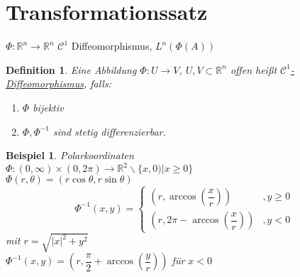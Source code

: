 \documentclass[11pt]{memoir}
\theoremstyle{changebreak}
\newtheorem{Definition}{Definition}[chapter]
\newtheorem{Beispiel}{Beispiel}[chapter]
\begin{document}
\newpage


\section{Transformationssatz}


$\Phi: \mathbb R^n \rightarrow \mathbb R^n$ $\mathscr C^1$ Diffeomorphismus, $L^n(\Phi(A))$

\begin{Definition}
Eine Abbildung $\Phi: U \rightarrow V$, $U, V \subset \mathbb R^n$ offen heißt \underline{$\mathscr C^1$-Diffeomorphismus}, falls:
\begin{enumerate}
	\item $\Phi$ bijektiv
	\item $\Phi, \Phi^{-1}$ sind stetig differenzierbar.
\end{enumerate}
\end{Definition}

\begin{Beispiel}
\emph{Polarkoordinaten} \\
$\Phi: (0, \infty) \times (0, 2\pi) \rightarrow \mathbb R^2 \backslash \{x, 0)| x \geq 0\}$ \\
$\Phi(r, \theta) = (r \cos \theta, r \sin \theta)$ \\
\begin{equation}
	\Phi^{-1}(x, y) =
	\begin{cases}
		(r, \arccos\left(\dfrac{x}{r}\right)) & , y \geq 0 \\
		(r, 2\pi - \arccos\left(\dfrac{x}{r}\right)) & , y < 0
	\end{cases}
\end{equation}
mit $r = \sqrt{|x|^2 + y^2} $\\
$\Phi^{-1} (x, y) = \left(r, \dfrac{\pi}{2} + \arccos\left(\dfrac{y}{r}\right)\right)$ für $x < 0$

\end{Beispiel}
\end{document}
